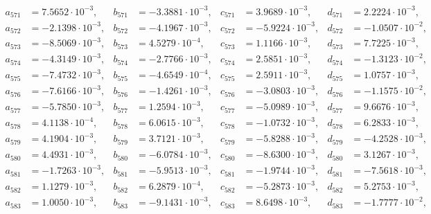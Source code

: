 \begin{align*}
  a_{ 571 } &= 7.5652 \cdot 10^{ -3 }, & b_{ 571 } &= -3.3881 \cdot 10^{ -3 }, & c_{ 571 } &= 3.9689 \cdot 10^{ -3 }, & d_{ 571 } &= 2.2224 \cdot 10^{ -3 }, \\ 
  a_{ 572 } &= -2.1398 \cdot 10^{ -3 }, & b_{ 572 } &= -4.1967 \cdot 10^{ -3 }, & c_{ 572 } &= -5.9224 \cdot 10^{ -3 }, & d_{ 572 } &= -1.0507 \cdot 10^{ -2 }, \\ 
  a_{ 573 } &= -8.5069 \cdot 10^{ -3 }, & b_{ 573 } &= 4.5279 \cdot 10^{ -4 }, & c_{ 573 } &= 1.1166 \cdot 10^{ -3 }, & d_{ 573 } &= 7.7225 \cdot 10^{ -3 }, \\ 
  a_{ 574 } &= -4.3149 \cdot 10^{ -3 }, & b_{ 574 } &= -2.7766 \cdot 10^{ -3 }, & c_{ 574 } &= 2.5851 \cdot 10^{ -3 }, & d_{ 574 } &= -1.3123 \cdot 10^{ -2 }, \\ 
  a_{ 575 } &= -7.4732 \cdot 10^{ -3 }, & b_{ 575 } &= -4.6549 \cdot 10^{ -4 }, & c_{ 575 } &= 2.5911 \cdot 10^{ -3 }, & d_{ 575 } &= 1.0757 \cdot 10^{ -3 }, \\ 
  a_{ 576 } &= -7.6166 \cdot 10^{ -3 }, & b_{ 576 } &= -1.4261 \cdot 10^{ -3 }, & c_{ 576 } &= -3.0803 \cdot 10^{ -3 }, & d_{ 576 } &= -1.1575 \cdot 10^{ -2 }, \\ 
  a_{ 577 } &= -5.7850 \cdot 10^{ -3 }, & b_{ 577 } &= 1.2594 \cdot 10^{ -3 }, & c_{ 577 } &= -5.0989 \cdot 10^{ -3 }, & d_{ 577 } &= 9.6676 \cdot 10^{ -3 }, \\ 
  a_{ 578 } &= 4.1138 \cdot 10^{ -4 }, & b_{ 578 } &= 6.0615 \cdot 10^{ -3 }, & c_{ 578 } &= -1.0732 \cdot 10^{ -3 }, & d_{ 578 } &= 6.2833 \cdot 10^{ -3 }, \\ 
  a_{ 579 } &= 4.1904 \cdot 10^{ -3 }, & b_{ 579 } &= 3.7121 \cdot 10^{ -3 }, & c_{ 579 } &= -5.8288 \cdot 10^{ -3 }, & d_{ 579 } &= -4.2528 \cdot 10^{ -3 }, \\ 
  a_{ 580 } &= 4.4931 \cdot 10^{ -3 }, & b_{ 580 } &= -6.0784 \cdot 10^{ -3 }, & c_{ 580 } &= -8.6300 \cdot 10^{ -3 }, & d_{ 580 } &= 3.1267 \cdot 10^{ -3 }, \\ 
  a_{ 581 } &= -1.7263 \cdot 10^{ -3 }, & b_{ 581 } &= -5.9513 \cdot 10^{ -3 }, & c_{ 581 } &= -1.9744 \cdot 10^{ -3 }, & d_{ 581 } &= -7.5618 \cdot 10^{ -3 }, \\ 
  a_{ 582 } &= 1.1279 \cdot 10^{ -3 }, & b_{ 582 } &= 6.2879 \cdot 10^{ -4 }, & c_{ 582 } &= -5.2873 \cdot 10^{ -3 }, & d_{ 582 } &= 5.2753 \cdot 10^{ -3 }, \\ 
  a_{ 583 } &= 1.0050 \cdot 10^{ -3 }, & b_{ 583 } &= -9.1431 \cdot 10^{ -3 }, & c_{ 583 } &= 8.6498 \cdot 10^{ -3 }, & d_{ 583 } &= -1.7777 \cdot 10^{ -2 }, \\ 

\end{align*}
